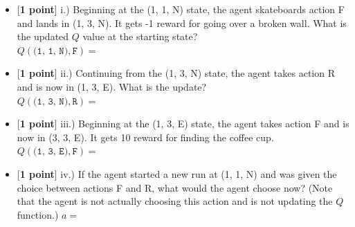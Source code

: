 \begin{itemize}
    \item [] {[\textbf{1 point}]} i.) Beginning at the (1, 1, N) state, the agent skateboards action F and lands in (1, 3, N). It gets -1 reward for going over a broken wall. What is the updated $Q$ value at the starting state?\\ $Q(\texttt{(1, 1, N)}, \texttt{F})=$ \begin{tcolorbox}[fit,height=1cm, width=4cm, blank, borderline={1pt}{-2pt}]
    \end{tcolorbox}
    \item [] {[\textbf{1 point}]} ii.) Continuing from the (1, 3, N) state, the agent takes action R and is now in (1, 3, E). What is the update?\\ $Q(\texttt{(1, 3, N)}, \texttt{R})=$ \begin{tcolorbox}[fit,height=1cm, width=4cm, blank, borderline={1pt}{-2pt}]
    \end{tcolorbox}

    \clearpage
    
    \item [] {[\textbf{1 point}]} iii.) Beginning at the (1, 3, E) state, the agent takes action F and is now in (3, 3, E). It gets 10 reward for finding the coffee cup.\\ $Q(\texttt{(1, 3, E)}, \texttt{F})=$ \begin{tcolorbox}[fit,height=1cm, width=4cm, blank, borderline={1pt}{-2pt}]
    \end{tcolorbox}
    \item [] {[\textbf{1 point}]} iv.) If the agent started a new run at (1, 1, N) and was given the choice between actions F and R, what would the agent choose now? (Note that the agent is not actually choosing this action and is not updating the $Q$ function.) $a=$ \begin{tcolorbox}[fit,height=1cm, width=4cm, blank, borderline={1pt}{-2pt}]


\end{tcolorbox}
\end{itemize}
